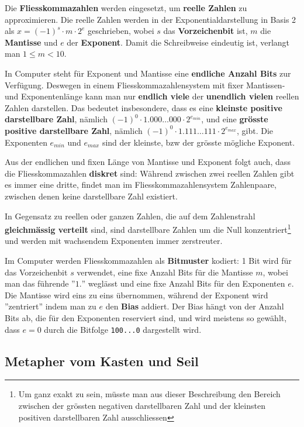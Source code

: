 \documentclass{article}
\begin{document}
Die \textbf{Fliesskommazahlen} werden eingesetzt, um \textbf{reelle Zahlen} zu approximieren. Die reelle Zahlen werden in der Exponentialdarstellung in Basis 2 als \(x = (-1)^s \cdot m \cdot 2^e\) geschrieben, wobei \(s\) das \textbf{Vorzeichenbit} ist, \(m\) die \textbf{Mantisse} und \(e\) der \textbf{Exponent}. Damit die Schreibweise eindeutig ist, verlangt man \(1 \leq m < 10\).

In Computer steht für Exponent und Mantisse eine \textbf{endliche Anzahl Bits} zur Verfügung. Deswegen in einem Fliesskommazahlensystem mit fixer Mantissen- und Exponentenlänge kann man nur \textbf{endlich viele}  der \textbf{unendlich vielen} reellen Zahlen darstellen. Das bedeutet insbesondere, dass es eine \textbf{kleinste positive darstellbare Zahl}, nämlich \((-1)^0 \cdot 1.000\ldots000 \cdot 2^{e_{min}}\), und eine \textbf{grösste positive darstellbare Zahl}, nämlich \((-1)^0 \cdot 1.111\ldots111 \cdot 2^{e_{max}}\), gibt. Die Exponenten \(e_{min}\) und \(e_{max}\) sind der kleinste, bzw der grösste mögliche Exponent.

Aus der endlichen und fixen Länge von Mantisse und Exponent folgt auch, dass die Fliesskommazahlen \textbf{diskret} sind: Während zwischen zwei reellen Zahlen gibt es immer eine dritte, findet man im Fliesskommazahlensystem Zahlenpaare, zwischen denen keine darstellbare Zahl existiert.

In Gegensatz zu reellen oder ganzen Zahlen, die auf dem Zahlenstrahl \textbf{gleichmässig verteilt} sind, sind darstellbare Zahlen um die Null konzentriert\footnote{Um ganz exakt zu sein, müsste man aus dieser Beschreibung den Bereich zwischen der grössten negativen darstellbaren Zahl und der kleinsten positiven darstellbaren Zahl ausschliessen} und werden mit wachsendem Exponenten immer zerstreuter.

Im Computer werden Fliesskommazahlen als \textbf{Bitmuster} kodiert: 1 Bit wird für das Vorzeichenbit \(s\) verwendet, eine fixe Anzahl Bits für die Mantisse \(m\), wobei man das führende ''\(1.\)'' weglässt und eine fixe Anzahl Bits für den Exponenten \(e\). Die Mantisse wird eins zu eins übernommen, während der Exponent wird ''zentriert'' indem man zu \(e\) den \textbf{Bias} addiert. Der Bias hängt von der Anzahl Bits ab, die für den Exponenten reserviert sind, und wird meistens so gewählt, dass \(e = 0\) durch die Bitfolge \texttt{100...0} dargestellt wird.


\subsection*{Metapher vom Kasten und Seil}
\end{document}
